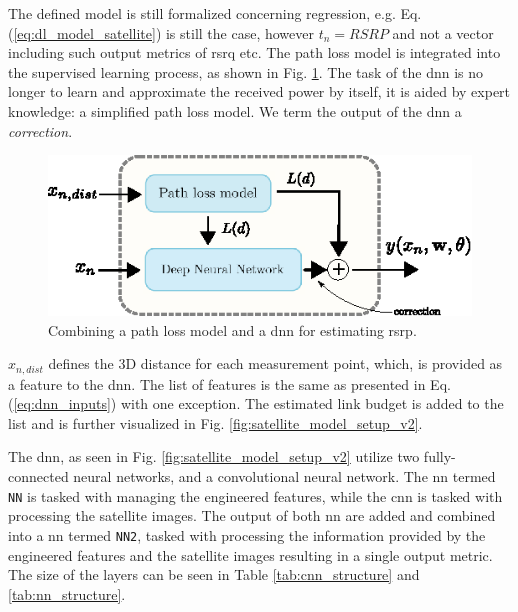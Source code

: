 The defined model is still formalized concerning regression, e.g. Eq. (\ref{eq:dl_model_satellite}) is still the case, however $t_n = RSRP$ and not a vector including such output metrics of \gls{rsrq} etc. The path loss model is integrated into the supervised learning process, as shown in Fig. \ref{fig:combined_model_approach}. The task of the \gls{dnn} is no longer to learn and approximate the received power by itself, it is aided by expert knowledge: a simplified path loss model. We term the output of the \gls{dnn} a \emph{correction}.


\begin{figure}
    \centering
    \includegraphics[width=\textwidth]{chapters/part_pathloss/model_aided_paper/combined_model_approach.eps}
    \caption{Combining a path loss model and a \gls{dnn} for estimating \gls{rsrp}.}
    \label{fig:combined_model_approach}
\end{figure}

 $x_{n,dist}$ defines the 3D distance for each measurement point, which, is provided as a feature to the \gls{dnn}. The list of features is the same as presented in Eq. (\ref{eq:dnn_inputs}) with one exception. The estimated link budget is added to the list and is further visualized in Fig. \ref{fig:satellite_model_setup_v2}.
 
The \gls{dnn}, as seen in Fig. \ref{fig:satellite_model_setup_v2} utilize two fully-connected neural networks, and a convolutional neural network. The \gls{nn} termed \texttt{NN} is tasked with managing the engineered features, while the \gls{cnn} is tasked with processing the satellite images. The output of both \gls{nn} are added and combined into a \gls{nn} termed \texttt{NN2}, tasked with processing the information provided by the engineered features and the satellite images resulting in a single output metric. The size of the layers can be seen in Table \ref{tab:cnn_structure} and \ref{tab:nn_structure}.

